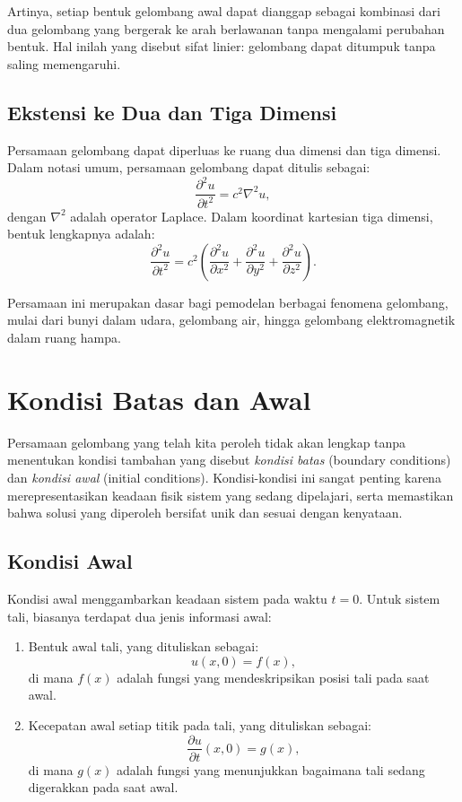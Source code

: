 \documentclass{bukumjh}
\begin{document}
Artinya, setiap bentuk gelombang awal dapat dianggap sebagai kombinasi dari dua gelombang yang bergerak ke arah berlawanan tanpa mengalami perubahan bentuk. 
Hal inilah yang disebut sifat linier: gelombang dapat ditumpuk tanpa saling memengaruhi.

\subsection*{Ekstensi ke Dua dan Tiga Dimensi}
Persamaan gelombang dapat diperluas ke ruang dua dimensi dan tiga dimensi. 
Dalam notasi umum, persamaan gelombang dapat ditulis sebagai:
\[
\frac{\partial^2 u}{\partial t^2} = c^2 \nabla^2 u,
\]
dengan $\nabla^2$ adalah operator Laplace. 
Dalam koordinat kartesian tiga dimensi, bentuk lengkapnya adalah:
\[
\frac{\partial^2 u}{\partial t^2} = c^2 \left( 
\frac{\partial^2 u}{\partial x^2} + 
\frac{\partial^2 u}{\partial y^2} + 
\frac{\partial^2 u}{\partial z^2}
\right).
\]

Persamaan ini merupakan dasar bagi pemodelan berbagai fenomena gelombang, mulai dari bunyi dalam udara, gelombang air, hingga gelombang elektromagnetik dalam ruang hampa.

\section{Kondisi Batas dan Awal}

Persamaan gelombang yang telah kita peroleh tidak akan lengkap tanpa menentukan kondisi tambahan yang disebut \emph{kondisi batas} (boundary conditions) dan \emph{kondisi awal} (initial conditions). 
Kondisi-kondisi ini sangat penting karena merepresentasikan keadaan fisik sistem yang sedang dipelajari, serta memastikan bahwa solusi yang diperoleh bersifat unik dan sesuai dengan kenyataan.

\subsection*{Kondisi Awal}
Kondisi awal menggambarkan keadaan sistem pada waktu $t=0$. 
Untuk sistem tali, biasanya terdapat dua jenis informasi awal:
\begin{enumerate}
  \item Bentuk awal tali, yang dituliskan sebagai:
  \[
  u(x,0) = f(x),
  \]
  di mana $f(x)$ adalah fungsi yang mendeskripsikan posisi tali pada saat awal.
  \item Kecepatan awal setiap titik pada tali, yang dituliskan sebagai:
  \[
  \frac{\partial u}{\partial t}(x,0) = g(x),
  \]
  di mana $g(x)$ adalah fungsi yang menunjukkan bagaimana tali sedang digerakkan pada saat awal.
\end{enumerate}
\end{document}
